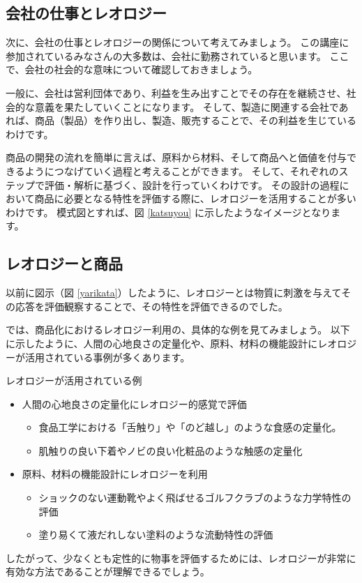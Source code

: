 \documentclass[uplatex,dvipdfmx,a4paper,11pt]{jsreport}
\begin{document}
\subsection{会社の仕事とレオロジー}

次に、会社の仕事とレオロジーの関係について考えてみましょう。
この講座に参加されているみなさんの大多数は、会社に勤務されていると思います。
ここで、会社の社会的な意味について確認しておきましょう。

一般に、会社は営利団体であり、利益を生み出すことでその存在を継続させ、社会的な意義を果たしていくことになります。
そして、製造に関連する会社であれば、商品（製品）を作り出し、製造、販売することで、その利益を生じているわけです。

商品の開発の流れを簡単に言えば、原料から材料、そして商品へと価値を付与できるようにつなげていく過程と考えることができます。
そして、それぞれのステップで評価・解析に基づく、設計を行っていくわけです。
その設計の過程において商品に必要となる特性を評価する際に、レオロジーを活用することが多いわけです。
模式図とすれば、図 \ref{katsuyou} に示したようなイメージとなります。

\subsection{レオロジーと商品}

以前に図示（図 \ref{yarikata}）したように、レオロジーとは物質に刺激を与えてその応答を評価観察することで、その特性を評価できるのでした。

では、商品化におけるレオロジー利用の、具体的な例を見てみましょう。
以下に示したように、人間の心地良さの定量化や、原料、材料の機能設計にレオロジーが活用されている事例が多くあります。
\large
	\begin{itembox}[l]{レオロジーが活用されている例}
		\begin{itemize}
			\item
			人間の心地良さの定量化にレオロジー的感覚で評価
			\begin{itemize}
				\item 食品工学における「舌触り」や「のど越し」のような食感の定量化。
				\item 肌触りの良い下着やノビの良い化粧品のような触感の定量化
			\end{itemize}
			\item
			原料、材料の機能設計にレオロジーを利用
			\begin{itemize}
			\item
				ショックのない運動靴やよく飛ばせるゴルフクラブのような力学特性の評価
			\item
				塗り易くて液だれしない塗料のような流動特性の評価
			\end{itemize}
		\end{itemize}
	\end{itembox}
\normalsize
したがって、少なくとも定性的に物事を評価するためには、レオロジーが非常に有効な方法であることが理解できるでしょう。
\end{document}
